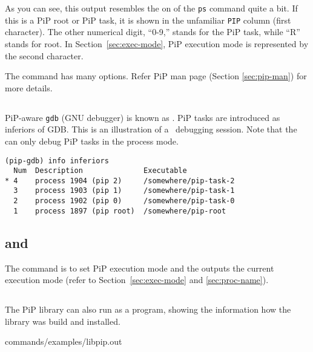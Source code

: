 As you can see, this output resembles the on of the {\tt ps} command
quite a bit. If this is a PiP root or PiP task, it is shown in the
unfamiliar {\tt PIP} column (first character). The other numerical
digit, ``0-9,'' stands for the PiP task, while ``R'' stands for
root. In Section~\ref{sec:exec-mode}, PiP execution 
mode is represented by the second character.

The  command has many options. Refer PiP man page
(Section \ref{sec:pip-man}) for more details. 

\subsection{}\label{sec:pip-gdb}

PiP-aware {\tt gdb} (GNU debugger) is known as . PiP
tasks are introduced as inferiors of GDB. This is an illustration of a
\pipgdb\ debugging session. Note that the  can only
debug PiP tasks in the process mode.

\begin{lstlisting}[frame=tRBl]
(pip-gdb) info inferiors
  Num  Description              Executable
* 4    process 1904 (pip 2)     /somewhere/pip-task-2
  3    process 1903 (pip 1)     /somewhere/pip-task-1
  2    process 1902 (pip 0)     /somewhere/pip-task-0
  1    process 1897 (pip root)  /somewhere/pip-root
\end{lstlisting}

\subsection{ and }\label{sec:pip-mode}

The  command is to set PiP execution mode and the
 outputs the current execution mode (refer to
Section~\ref{sec:exec-mode} and \ref{sec:proc-name}). 

\subsection{}

The PiP library  can also run as a program, showing the
information how the library was build and installed.


                {commands/examples/libpip.out}
